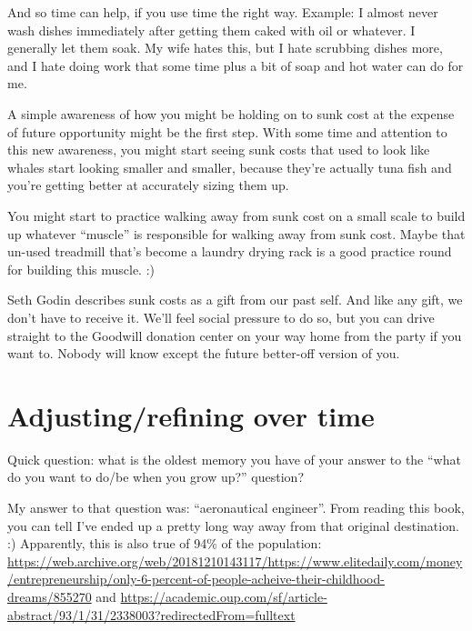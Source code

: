 And so time can help, if you use time the right way. Example: I almost never wash dishes immediately after getting them caked with oil or whatever. I generally let them soak. My wife hates this, but I hate scrubbing dishes more, and I hate doing work that some time plus a bit of soap and hot water can do for me.

A simple awareness of how you might be holding on to sunk cost at the expense of future opportunity might be the first step. With some time and attention to this new awareness, you might start seeing sunk costs that used to look like whales start looking smaller and smaller, because they’re actually tuna fish and you’re getting better at accurately sizing them up.

You might start to practice walking away from sunk cost on a small scale to build up whatever “muscle” is responsible for walking away from sunk cost. Maybe that un-used treadmill that’s become a laundry drying rack is a good practice round for building this muscle. :)

Seth Godin describes sunk costs as a gift from our past self. And like any gift, we don’t have to receive it. We’ll feel social pressure to do so, but you can drive straight to the Goodwill donation center on your way home from the party if you want to. Nobody will know except the future better-off version of you.

\section{Adjusting/refining over time}

Quick question: what is the oldest memory you have of your answer to the ``what do you want to do/be when you grow up?'' question?

My answer to that question was: ``aeronautical engineer''. From reading this book, you can tell I've ended up a pretty long way away from that original destination. :) Apparently, this is also true of 94\% of the population: \href{https://web.archive.org/web/20181210143117/https://www.elitedaily.com/money/entrepreneurship/only-6-percent-of-people-acheive-their-childhood-dreams/855270}{https://web.archive.org/web/20181210143117/https://www.elitedaily.com/money/entrepreneurship/only-6-percent-of-people-acheive-their-childhood-dreams/855270} and \href{https://academic.oup.com/sf/article-abstract/93/1/31/2338003?redirectedFrom=fulltext}{https://academic.oup.com/sf/article-abstract/93/1/31/2338003?redirectedFrom=fulltext}

